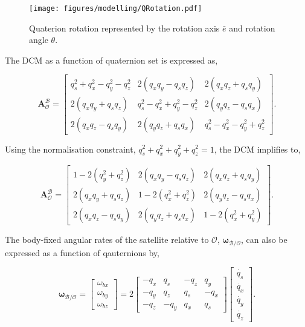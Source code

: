 \begin{figure}[H]
    \centering
    \texttt{[image: figures/modelling/QRotation.pdf]}
    \caption{Quaterion rotation represented by the rotation axis $\bar{e}$ and rotation angle $\theta$.}
    \label{fig:3.2}
\end{figure}

\noindent The DCM as a function of quaternion set is expressed as,

\begin{equation}
    \mathbf{A}_{\mathcal{O}}^{\mathcal{B}} = 
    \begin{bmatrix}
    q_s^2 + q_x^2 - q_y^2 - q_z^2 & 2(q_x q_y - q_s q_z) & 2(q_x q_z + q_s q_y) \\
    2(q_x q_y + q_s q_z) & q_s^2 - q_x^2 + q_y^2 - q_z^2 & 2(q_y q_z - q_s q_x) \\
    2(q_x q_z - q_s q_y) & 2(q_y q_z + q_s q_x) & q_s^2 - q_x^2 - q_y^2 + q_z^2   
    \end{bmatrix}
    \text{.}
\end{equation}

\noindent Using the normalisation constraint, $q_s^2 + q_x^2 + q_y^2 + q_z^2 = 1$, the DCM implifies to,

\begin{equation}
    \mathbf{A}_{\mathcal{O}}^{\mathcal{B}} = 
    \begin{bmatrix}
    1 - 2(q_y^2 + q_z^2) & 2(q_x q_y - q_s q_z) & 2(q_x q_z + q_s q_y) \\
    2(q_x q_y + q_s q_z) & 1 - 2(q_x^2 + q_z^2) & 2(q_y q_z - q_s q_x) \\
    2(q_x q_z - q_s q_y) & 2(q_y q_z + q_s q_x) & 1 - 2(q_x^2 + q_y^2)   
    \end{bmatrix}
    \text{.}
    \label{Eq:3.10}
\end{equation}

\noindent The body-fixed angular rates of the satellite relative to $\mathcal{O}$, $\boldsymbol{\omega}_{\mathcal{B/O}}$, can also be expressed as a function of qauternions by,

\begin{equation}
    \boldsymbol{\omega}_\mathcal{B/O} = 
    \begin{bmatrix}
        \omega_{bx} \\ \omega_{by} \\ \omega_{bz}
    \end{bmatrix}
    = 2
    \begin{bmatrix}
       -q_x & q_s & -q_z & q_y \\
       -q_y & q_z & q_s & -q_x \\
       -q_z & -q_y & q_x & q_s 
    \end{bmatrix}
    \begin{bmatrix}
        \dot{q_s} \\ \dot{q_x} \\ \dot{q_y} \\ \dot{q_z}
    \end{bmatrix}
    \text{.}
\end{equation}

